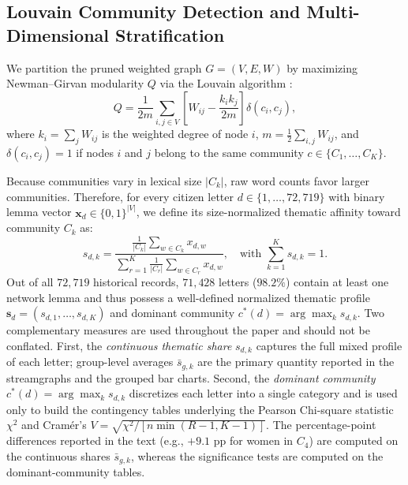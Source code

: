 \documentclass[pdflatex,sn-basic]{sn-jnl}
\begin{document}
\subsection{Louvain Community Detection and Multi-Dimensional Stratification}
We partition the pruned weighted graph $G=(V,E,W)$ by maximizing Newman--Girvan modularity $Q$ \citep{newman2006modularity} via the Louvain algorithm \citep{blondel2008fast,cordeiro2016dynamic,traag2019louvain}:
\begin{equation}
    Q = \frac{1}{2m} \sum_{i,j \in V} \left[ W_{ij} - \frac{k_i k_j}{2m} \right] \delta(c_i, c_j),
\end{equation}
where $k_i = \sum_j W_{ij}$ is the weighted degree of node $i$, $m = \frac{1}{2}\sum_{i,j} W_{ij}$, and $\delta(c_i, c_j) = 1$ if nodes $i$ and $j$ belong to the same community $c \in \{C_1, \dots, C_K\}$.

Because communities vary in lexical size $|C_k|$, raw word counts favor larger communities. Therefore, for every citizen letter $d \in \{1, \dots, 72,719\}$ with binary lemma vector $\mathbf{x}_d \in \{0,1\}^{|V|}$, we define its size-normalized thematic affinity toward community $C_k$ as:
\begin{equation}
    s_{d,k} = \frac{\frac{1}{|C_k|} \sum_{w \in C_k} x_{d,w}}{\sum_{r=1}^{K} \frac{1}{|C_r|} \sum_{w \in C_r} x_{d,w}}, \quad \text{with } \sum_{k=1}^{K} s_{d,k} = 1.
\end{equation}
Out of all $72,719$ historical records, $71,428$ letters ($98.2\%$) contain at least one network lemma and thus possess a well-defined normalized thematic profile $\mathbf{s}_d = (s_{d,1}, \dots, s_{d,K})$ and dominant community $c^*(d) = \arg\max_k s_{d,k}$. %
Two complementary measures are used throughout the paper and should not be conflated. First, the \emph{continuous thematic share} $s_{d,k}$ captures the full mixed profile of each letter; group-level averages $\bar{s}_{g,k}$ are the primary quantity reported in the streamgraphs and the grouped bar charts. Second, the \emph{dominant community} $c^*(d) = \arg\max_k s_{d,k}$ discretizes each letter into a single category and is used only to build the contingency tables underlying the Pearson Chi-square statistic $\chi^2$ and Cram\'{e}r's $V = \sqrt{\chi^2 / [n \min(R-1, K-1)]}$. The percentage-point differences reported in the text (e.g., $+9.1$ pp for women in $C_4$) are computed on the continuous shares $\bar{s}_{g,k}$, whereas the significance tests are computed on the dominant-community tables.
\end{document}

